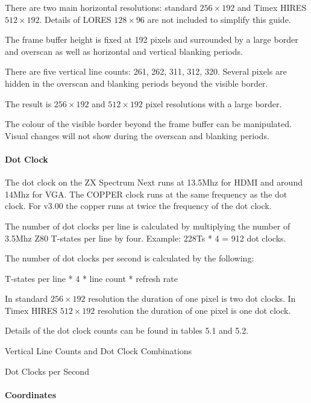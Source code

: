There are two main horizontal resolutions: standard $256\times192$ and
Timex HIRES $512\times192$. Details of LORES $128\times96$ are not
included to simplify this guide.

The frame buffer height is fixed at 192 pixels and surrounded by a
large border and overscan as well as horizontal and vertical blanking
periods.

There are five vertical line counts: 261, 262, 311, 312, 320. Several
pixels are hidden in the overscan and blanking periods beyond the
visible border.

The result is $256\times192$ and $512\times192$ pixel resolutions with
a large border.

The colour of the visible border beyond the frame buffer can be
manipulated. Visual changes will not show during the overscan and
blanking periods.

\paragraph{Dot Clock}

The dot clock on the ZX Spectrum Next runs at 13.5Mhz for HDMI and
around 14Mhz for VGA. The COPPER clock runs at the same frequency as
the dot clock. For v3.00 the copper runs at twice the frequency of the
dot clock.

The number of dot clocks per line is calculated by multiplying the
number of 3.5Mhz Z80 T-states per line by four. Example: 228Ts * 4 =
912 dot clocks.

The number of dot clocks per second is calculated by the following:

T-states per line * 4 * line count * refresh rate

In standard $256\times192$ resolution the duration of one pixel is two
dot clocks. In Timex HIRES $512\times192$ resolution the duration of
one pixel is one dot clock.

Details of the dot clock counts can be found in tables 5.1 and 5.2.

\begin{table}[ht]\centering
  \caption{Vertical Line Counts and Dot Clock Combinations}
\end{table}

\begin{table}[ht]\centering
  \caption{Dot Clocks per Second}
\end{table}

\paragraph{Coordinates}

